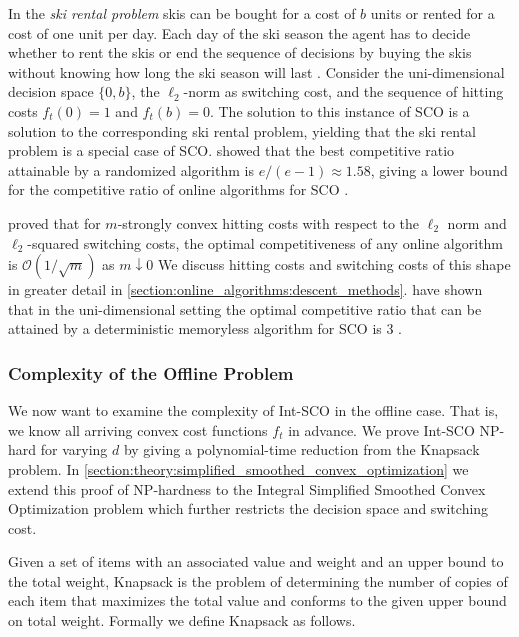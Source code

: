 In the \textit{ski rental problem} skis can be bought for a cost of $b$ units or rented for a cost of one unit per day. Each day of the ski season the agent has to decide whether to rent the skis or end the sequence of decisions by buying the skis without knowing how long the ski season will last \cite{Shah2021}. Consider the uni-dimensional decision space $\{0,b\}$, the $\ell_2$-norm as switching cost, and the sequence of hitting costs $f_t(0) = 1$ and $f_t(b) = 0$. The solution to this instance of SCO is a solution to the corresponding ski rental problem, yielding that the ski rental problem is a special case of SCO. \citeauthor*{Karlin1990} showed that the best competitive ratio attainable by a randomized algorithm is $e/(e-1) \approx 1.58$, giving a lower bound for the competitive ratio of online algorithms for SCO \cite{Karlin1990}.

\citeauthor*{Goel2019} proved that for $m$-strongly convex hitting costs with respect to the $\ell_2$ norm and $\ell_2$-squared switching costs, the optimal competitiveness of any online algorithm is $\mathcal{O}(1/\sqrt{m})$ as $m \downarrow 0$ \cite{Goel2019} We discuss hitting costs and switching costs of this shape in greater detail in \autoref{section:online_algorithms:descent_methods}. \citeauthor*{Bansal2015} have shown that in the uni-dimensional setting the optimal competitive ratio that can be attained by a deterministic memoryless algorithm for SCO is 3 \cite{Bansal2015}.

\subsubsection{Complexity of the Offline Problem}

We now want to examine the complexity of Int-SCO in the offline case. That is, we know all arriving convex cost functions $f_t$ in advance. We prove Int-SCO NP-hard for varying $d$ by giving a polynomial-time reduction from the Knapsack problem. In \autoref{section:theory:simplified_smoothed_convex_optimization} we extend this proof of NP-hardness to the Integral Simplified Smoothed Convex Optimization problem which further restricts the decision space and switching cost.

Given a set of items with an associated value and weight and an upper bound to the total weight, Knapsack is the problem of determining the number of copies of each item that maximizes the total value and conforms to the given upper bound on total weight. Formally we define Knapsack as follows.

